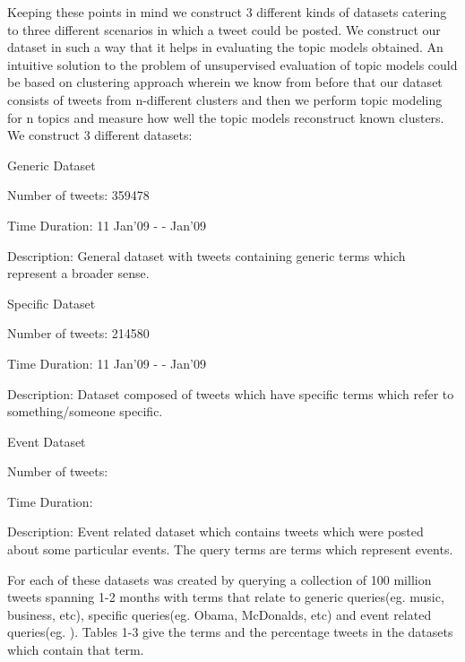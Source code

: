 \documentclass[10pt,a5paper,twoside]{article}
\begin{document}
Keeping these points in mind we construct 3 different kinds of datasets catering to three different scenarios in which a tweet could be posted. We construct our dataset in such a way that it helps in evaluating the topic models obtained. An intuitive solution to the problem of unsupervised evaluation of topic models could be based on clustering approach wherein we know from before that our dataset consists of tweets from n-different clusters and then we perform topic modeling for n topics and measure how well the topic models reconstruct known clusters. We construct 3 different datasets:
\begin{compactenum}

\item Generic Dataset
\begin{compactitem}
\item Number of tweets: 359478
\item Time Duration: 11 Jan'09 - - Jan'09
\item Description: General dataset with tweets containing generic terms which represent a broader sense.
\end{compactitem}

\item Specific Dataset
\begin{compactitem}
\item Number of tweets: 214580
\item Time Duration: 11 Jan'09 - - Jan'09
\item Description: Dataset composed of tweets which have specific terms which refer to something/someone specific.
\end{compactitem}

\item Event Dataset
\begin{compactitem}
\item Number of tweets: 
\item Time Duration:
\item Description: Event related dataset which contains tweets which were posted about some particular events. The query terms are terms which represent events.
\end{compactitem}

\end{compactenum}

For each of these datasets was created by querying a collection of 100 million tweets spanning 1-2 months with terms that relate to generic queries(eg. music, business, etc), specific queries(eg. Obama, McDonalds, etc) and event related queries(eg. ). Tables 1-3 give the terms and the percentage tweets in the datasets which contain that term.
\\
\end{document}

